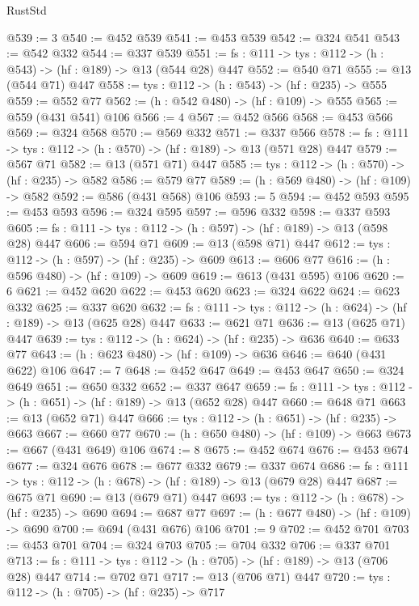 \begin{lexlean}{RustStd}
\begin{coremodule}
@539 := 3
@540 := @452 @539
@541 := @453 @539
@542 := @324 @541
@543 := @542 @332
@544 := @337 @539
@551 := {fs : @111} -> {tys : @112} -> (h : @543) -> (hf : @189) -> @13 (@544 @28) @447
@552 := @540 @71
@555 := @13 (@544 @71) @447
@558 := {tys : @112} -> (h : @543) -> (hf : @235) -> @555
@559 := @552 @77
@562 := (h : @542 @480) -> (hf : @109) -> @555
@565 := @559 (@431 @541) @106
@566 := 4
@567 := @452 @566
@568 := @453 @566
@569 := @324 @568
@570 := @569 @332
@571 := @337 @566
@578 := {fs : @111} -> {tys : @112} -> (h : @570) -> (hf : @189) -> @13 (@571 @28) @447
@579 := @567 @71
@582 := @13 (@571 @71) @447
@585 := {tys : @112} -> (h : @570) -> (hf : @235) -> @582
@586 := @579 @77
@589 := (h : @569 @480) -> (hf : @109) -> @582
@592 := @586 (@431 @568) @106
@593 := 5
@594 := @452 @593
@595 := @453 @593
@596 := @324 @595
@597 := @596 @332
@598 := @337 @593
@605 := {fs : @111} -> {tys : @112} -> (h : @597) -> (hf : @189) -> @13 (@598 @28) @447
@606 := @594 @71
@609 := @13 (@598 @71) @447
@612 := {tys : @112} -> (h : @597) -> (hf : @235) -> @609
@613 := @606 @77
@616 := (h : @596 @480) -> (hf : @109) -> @609
@619 := @613 (@431 @595) @106
@620 := 6
@621 := @452 @620
@622 := @453 @620
@623 := @324 @622
@624 := @623 @332
@625 := @337 @620
@632 := {fs : @111} -> {tys : @112} -> (h : @624) -> (hf : @189) -> @13 (@625 @28) @447
@633 := @621 @71
@636 := @13 (@625 @71) @447
@639 := {tys : @112} -> (h : @624) -> (hf : @235) -> @636
@640 := @633 @77
@643 := (h : @623 @480) -> (hf : @109) -> @636
@646 := @640 (@431 @622) @106
@647 := 7
@648 := @452 @647
@649 := @453 @647
@650 := @324 @649
@651 := @650 @332
@652 := @337 @647
@659 := {fs : @111} -> {tys : @112} -> (h : @651) -> (hf : @189) -> @13 (@652 @28) @447
@660 := @648 @71
@663 := @13 (@652 @71) @447
@666 := {tys : @112} -> (h : @651) -> (hf : @235) -> @663
@667 := @660 @77
@670 := (h : @650 @480) -> (hf : @109) -> @663
@673 := @667 (@431 @649) @106
@674 := 8
@675 := @452 @674
@676 := @453 @674
@677 := @324 @676
@678 := @677 @332
@679 := @337 @674
@686 := {fs : @111} -> {tys : @112} -> (h : @678) -> (hf : @189) -> @13 (@679 @28) @447
@687 := @675 @71
@690 := @13 (@679 @71) @447
@693 := {tys : @112} -> (h : @678) -> (hf : @235) -> @690
@694 := @687 @77
@697 := (h : @677 @480) -> (hf : @109) -> @690
@700 := @694 (@431 @676) @106
@701 := 9
@702 := @452 @701
@703 := @453 @701
@704 := @324 @703
@705 := @704 @332
@706 := @337 @701
@713 := {fs : @111} -> {tys : @112} -> (h : @705) -> (hf : @189) -> @13 (@706 @28) @447
@714 := @702 @71
@717 := @13 (@706 @71) @447
@720 := {tys : @112} -> (h : @705) -> (hf : @235) -> @717

\end{coremodule}
\end{lexlean}
